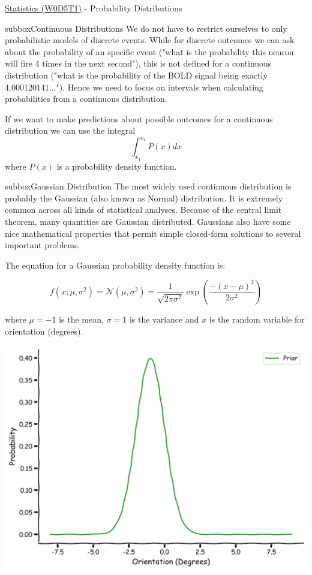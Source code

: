 \begin{textbox}{\href{https://compneuro.neuromatch.io/tutorials/W0D5_Statistics/student/W0D5_Tutorial1.html}{Statistics (W0D5T1)} - Probability Distributions}
\begin{subbox}{subbox}{Continuous Distributions}
\scriptsize
We do not have to restrict ourselves to only probabilistic models of discrete events. 
While for discrete outcomes we can ask about the probability of an specific event ("what is the probability this neuron will fire 4 times in the next second"), this is not defined for a continuous distribution ("what is the probability of the BOLD signal being exactly 4.000120141..."). Hence we need to focus on intervals when calculating probabilities from a continuous distribution. 

If we want to make predictions about possible outcomes for a continuous distribution we can use the integral
\begin{equation} 
\int_{x_1}^{x_2} P(x) dx 
\end{equation}
where $P(x)$ is a probability density function.

\end{subbox}
\begin{subbox}{subbox}{Gaussian Distribution}
\scriptsize
The most widely used continuous distribution is probably the Gaussian (also known as Normal) distribution. It is extremely common across all kinds of statistical analyses. Because of the central limit theorem, many quantities are Gaussian distributed. Gaussians also have some nice mathematical properties that permit simple closed-form solutions to several important problems. 

The equation for a Gaussian probability density function is:

\begin{equation}
f(x;\mu,\sigma^2) = \mathcal{N}(\mu,\sigma^2) = \frac{1}{\sqrt{2\pi\sigma^2}}\exp\left(\frac{-(x-\mu)^2}{2\sigma^2}\right)
\end{equation}

where $\mu=-1$ is the mean, $\sigma=1$ is the variance and $x$ is the random variable for orientation (degrees). 


\centering
\includegraphics[scale=0.1]{Figures/PreCourse/SFigure2.png}

\end{subbox}
\end{textbox}
